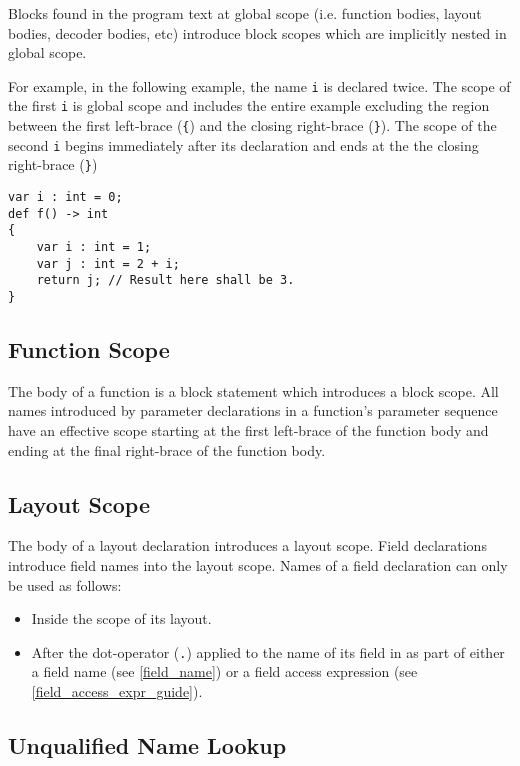 Blocks found in the program text at global scope (i.e. function bodies, layout bodies, decoder bodies, etc) introduce block scopes which are implicitly nested in global scope.

For example, in the following example, the name \texttt{i} is declared twice. The scope of the first \texttt{i} is global scope and includes the entire example excluding the region between the first left-brace (\texttt{\{}) and the closing right-brace (\texttt{\}}). The scope of the second \texttt{i} begins immediately after its declaration and ends at the the closing right-brace (\texttt{\}})

\noindent\begin{minipage}{\linewidth}
\begin{lstlisting}
var i : int = 0;
def f() -> int
{
	var i : int = 1;
	var j : int = 2 + i;
	return j; // Result here shall be 3.
}
\end{lstlisting}
\end{minipage}

\subsection{Function Scope} \label{function_scope}

The body of a function is a block statement which introduces a block scope. All names introduced by parameter declarations in a function's parameter sequence have an effective scope starting at the first left-brace of the function body and ending at the final right-brace of the function body.

\subsection{Layout Scope} \label{layout_scope}

The body of a layout declaration introduces a layout scope. Field declarations introduce field names into the layout scope. Names of a field declaration can only be used as follows:

\begin{itemize}
\item Inside the scope of its layout.
\item After the dot-operator (\texttt{.}) applied to the name of its field in as part of either a field name (see \ref{field_name}) or a field access expression (see \ref{field_access_expr_guide}).
\end{itemize}

\subsection{Unqualified Name Lookup} \label{unqlfd_lookup}

